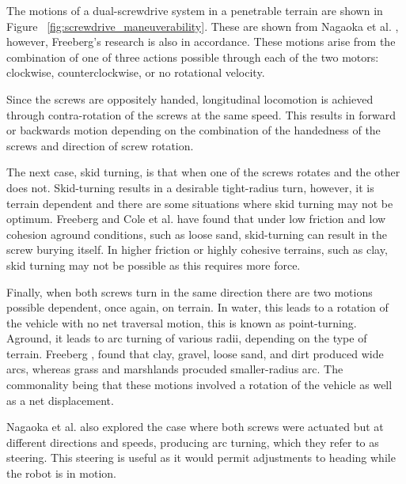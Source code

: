 The motions of a dual-screwdrive system in a penetrable terrain are shown in Figure ~\ref{fig:screwdrive_maneuverability}. These are shown from Nagaoka et al. \cite{Nagaoka2009a}, however, Freeberg's \cite{Freeberg2010} research is also in accordance. These motions arise from the combination of one of three actions possible through each of the two motors: clockwise, counterclockwise, or no rotational velocity. 

Since the screws are oppositely handed, longitudinal locomotion is achieved through contra-rotation of the screws at the same speed. This results in forward or backwards motion depending on the combination of the handedness of the screws and direction of screw rotation. 

The next case, skid turning, is that when one of the screws rotates and the other does not. Skid-turning results in a desirable tight-radius turn, however, it is terrain dependent and there are some situations where skid turning may not be optimum. Freeberg and Cole et al. have found that under low friction and low cohesion aground conditions, such as loose sand, skid-turning can result in the screw burying itself. In higher friction or highly cohesive terrains, such as clay, skid turning may not be possible as this requires more force.  

Finally, when both screws turn in the same direction there are two motions possible dependent, once again, on terrain. In water, this leads to a rotation of the vehicle with no net traversal motion, this is known as point-turning. Aground, it leads to arc turning of various radii, depending on the type of terrain. Freeberg \cite{Freeberg2010}, found that clay, gravel, loose sand, and dirt produced wide arcs, whereas grass and marshlands procuded smaller-radius arc. The commonality being that these motions involved a rotation of the vehicle as well as a net displacement. 

Nagaoka et al. \cite{Nagaoka2009a} also explored the case where both screws were actuated but at different directions and speeds, producing arc turning, which they refer to as steering. This steering is useful as it would permit adjustments to heading while the robot is in motion. 






